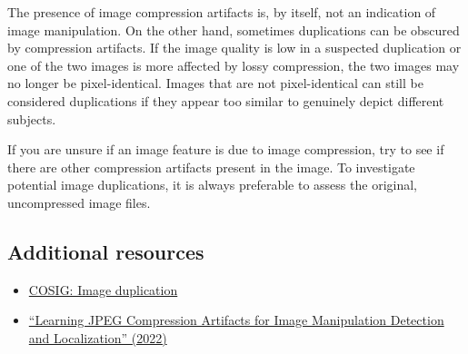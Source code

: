 \documentclass[letterpaper, 12pt]{article}
\begin{document}
The presence of image compression artifacts is, by itself, not an indication of image manipulation. On the other hand, sometimes duplications can be obscured by compression artifacts. If the image quality is low in a suspected duplication or one of the two images is more affected by lossy compression, the two images may no longer be pixel-identical. Images that are not pixel-identical can still be considered duplications if they appear too similar to genuinely depict different subjects.

If you are unsure if an image feature is due to image compression, try to see if there are other compression artifacts present in the image. To investigate potential image duplications, it is always preferable to assess the original, uncompressed image files.

\subsection*{Additional resources}

\begin{itemize}
    \setlength\itemsep{-0.5em}
    \item \href{https://osf.io/547re}{COSIG: Image duplication}
    \item \href{https://doi.org/10.1007/s11263-022-01617-5}{``Learning JPEG Compression Artifacts for Image Manipulation Detection and Localization'' (2022)}
\end{itemize}
\end{document}
